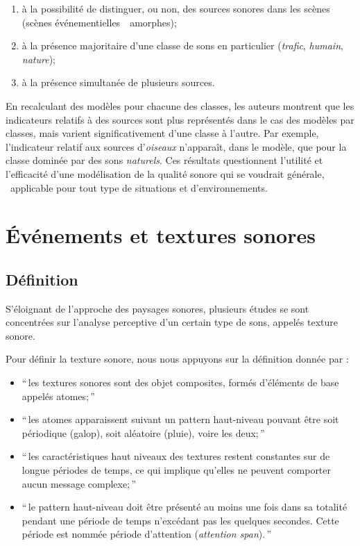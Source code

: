 \begin{enumerate}
\item à la possibilité de distinguer, ou non, des sources sonores dans les scènes (scènes événementielles~\vs~amorphes);
\item  à la présence majoritaire d'une classe de sons en particulier (\emph{trafic}, \emph{humain}, \emph{nature});
\item à la présence simultanée de plusieurs sources.
\end{enumerate}

En recalculant des modèles pour chacune des classes, les auteurs montrent que les indicateurs relatifs à des sources sont plus représentés dans le cas des modèles par classes, mais varient significativement d'une classe à l'autre. Par exemple, l’indicateur relatif aux sources d'\emph{oiseaux} n'apparaît, dans le modèle, que pour la classe dominée par des sons \emph{naturels}. Ces résultats questionnent l'utilité et l'efficacité d'une modélisation de la qualité sonore qui se voudrait générale, \ie~applicable pour tout type de situations et d'environnements.


\section{Événements et textures sonores}
\label{sec:ch3_eventTexture}

\subsection{Définition}

S'éloignant de l'approche des paysages sonores, plusieurs études se sont concentrées sur l'analyse perceptive d'un certain type de sons, appelés texture sonore.

Pour définir la texture sonore, nous nous appuyons sur la définition donnée par \citep[p. 25]{saint1995classification}:  

\begin{itemize}
\item ``\,les textures sonores sont des objet composites, formés d'éléments de base appelés atomes;\,''
\item ``\,les atomes apparaissent suivant un pattern haut-niveau pouvant être soit périodique (galop), soit aléatoire (pluie), voire les deux;\,''
\item ``\,les caractéristiques haut niveaux des textures restent constantes sur de longue périodes de temps, ce qui implique qu'elles ne peuvent comporter aucun message complexe;\,''
\item ``\,le pattern haut-niveau doit être présenté au moins une fois dans sa totalité pendant une période de temps n’excédant pas les quelques secondes. Cette période est nommée période d'attention (\emph{attention span}).\,''
\end{itemize}

